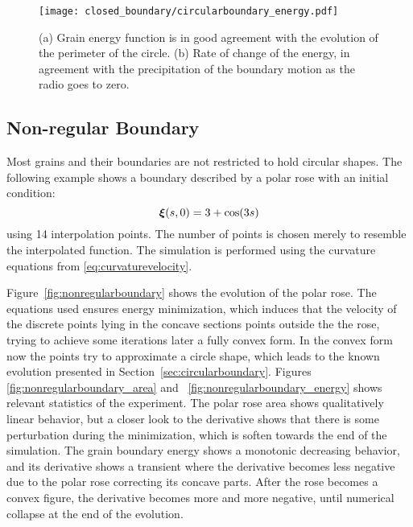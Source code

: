 \begin{figure}[t]
    \centering
    \texttt{[image: closed\_boundary/circularboundary\_energy.pdf]}
    \subfloat[\label{fig:circenergy}]{\hspace{.55\linewidth}}
    \subfloat[\label{fig:circdEdt}]{\hspace{.45\linewidth}}
    \caption[Circular boundary energy and rate of change]{(a) Grain energy function is in good agreement with the evolution of the perimeter of the circle. (b) Rate of change of the energy, in agreement with the precipitation of the boundary motion as the radio goes to zero.}
    \label{fig:circularboundary_energy}
\end{figure}

\subsection{Non-regular Boundary}

Most grains and their boundaries are not restricted to hold circular shapes. The following example shows a boundary described by a polar rose with an initial condition:
\begin{equation*}
    \bm{\xi}(s,0) = 3 + \cos(3s)
\end{equation*}
using 14 interpolation points. The number of points is chosen merely to resemble the interpolated function. The simulation is performed using the curvature equations from \eqref{eq:curvaturevelocity}. 

Figure~\ref{fig:nonregularboundary} shows the evolution of the polar rose. The equations used ensures energy minimization, which induces that the velocity of the discrete points lying in the concave sections points outside the the rose, trying to achieve some iterations later a fully convex form. In the convex form now the points try to approximate a circle shape, which leads to the known evolution presented in Section~\ref{sec:circularboundary}. Figures~ \ref{fig:nonregularboundary_area} and~ \ref{fig:nonregularboundary_energy} shows relevant statistics of the experiment. The polar rose area shows qualitatively linear behavior, but a closer look to the derivative shows that there is some perturbation during the minimization, which is soften towards the end of the simulation. The grain boundary energy shows a monotonic decreasing behavior, and its derivative shows a transient where the derivative becomes less negative due to the polar rose correcting its concave parts. After the rose becomes a convex figure, the derivative becomes more and more negative, until numerical collapse at the end of the evolution.

